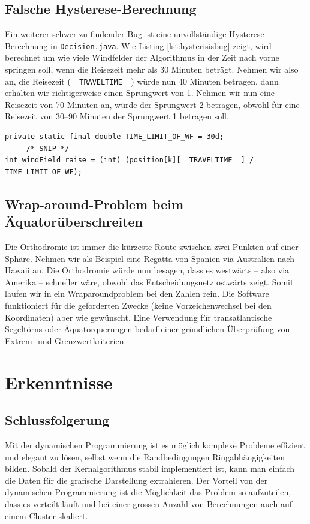 \subsection{Falsche Hysterese-Berechnung}
Ein weiterer schwer zu findender Bug ist eine unvollständige
Hysterese-Berechnung in \texttt{Decision.java}. Wie Listing
\ref{lst:hysterisisbug} zeigt, wird berechnet um wie viele Windfelder der
Algorithmus in der Zeit nach vorne springen soll, wenn die Reisezeit mehr als
30 Minuten beträgt. Nehmen wir also an, die Reisezeit
(\texttt{\_\_TRAVELTIME\_\_}) würde nun 40 Minuten betragen, dann erhalten wir
richtigerweise einen Sprungwert von 1. Nehmen wir nun eine Reisezeit von 70
Minuten an, würde der Sprungwert 2 betragen, obwohl für eine Reisezeit von
30--90 Minuten der Sprungwert 1 betragen soll.
\begin{lstlisting}[caption={Hystereseberechnung in Decision.java},label=lst:hysterisisbug]
private static final double TIME_LIMIT_OF_WF = 30d;
     /* SNIP */
int windField_raise = (int) (position[k][__TRAVELTIME__] / TIME_LIMIT_OF_WF);
\end{lstlisting}

\subsection{Wrap-around-Problem beim Äquatorüberschreiten}
Die Orthodromie ist immer die kürzeste Route zwischen zwei Punkten auf einer
Sphäre. Nehmen wir als Beispiel eine Regatta von Spanien via Australien nach
Hawaii an. Die Orthodromie würde nun besagen, dass es westwärts -- also via
Amerika -- schneller wäre, obwohl das Entscheidungsnetz ostwärts zeigt. Somit
laufen wir in ein Wraparoundproblem bei den Zahlen rein. Die Software
funktioniert für die geforderten Zwecke (keine Vorzeichenwechsel bei den
Koordinaten) aber wie gewünscht. Eine Verwendung für transatlantische
Segeltörns oder Äquatorquerungen bedarf einer gründlichen Überprüfung von
Extrem- und Grenzwertkriterien.

\section{Erkenntnisse}
\subsection{Schlussfolgerung}
Mit der dynamischen Programmierung ist es möglich komplexe Probleme effizient
und elegant zu lösen, selbst wenn die Randbedingungen Ringabhängigkeiten
bilden. Sobald der Kernalgorithmus stabil implementiert ist, kann man einfach
die Daten für die grafische Darstellung extrahieren. Der Vorteil von der
dynamischen Programmierung ist die Möglichkeit das Problem so aufzuteilen,
dass es verteilt läuft und bei einer grossen Anzahl von Berechnungen auch auf
einem Cluster skaliert.

